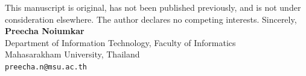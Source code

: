 \documentclass[11pt,a4paper]{article}
\begin{document}
This manuscript is original, has not been published previously, and is not under consideration elsewhere. The author declares no competing interests.
\vspace{6pt}
Sincerely,\\[10pt]
\textbf{Preecha Noiumkar}\\Department of Information Technology, Faculty of Informatics\\Mahasarakham University, Thailand\\\texttt{preecha.n@msu.ac.th}
\end{document}
